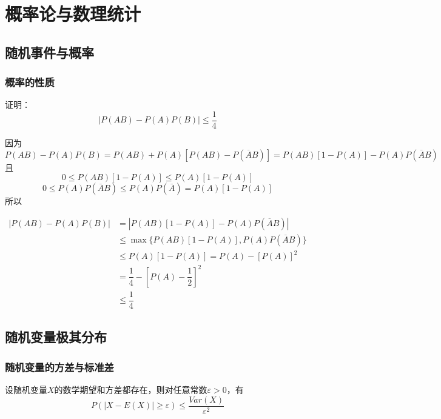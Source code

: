 \chapter{概率论与数理统计}

\section{随机事件与概率}

\subsection{概率的性质}

\begin{proposition}

    证明：
    $$|P(AB) - P(A)P(B)| \leq \dfrac{1}{4}$$

\end{proposition}

\begin{proposition}

    因为
    $$P(AB) - P(A)P(B) = P(AB) + P(A)[P(AB) - P(\overline{A}B)] = P(AB)[1 - P(A)] - P(A)P(\overline{A}B)$$
    且
    $$0 \leq P(AB)[1 - P(A)] \leq P(A)[1 - P(A)]$$
    $$0 \leq P(A)P(\overline{A}B) \leq P(A)P(\overline{A}) = P(A)[1 - P(A)]$$
    所以
    
    \begin{align*}
        |P(AB) - P(A)P(B)| & = |P(AB)[1 - P(A)] - P(A)P(\overline{A}B)| \\
        & \leq \max\{P(AB)[1 - P(A)], P(A)P(\overline{A}B)\} \\
        & \leq P(A)[1 - P(A)] = P(A) - [P(A)]^2 \\
        & = \dfrac{1}{4} - \left[ P(A) - \dfrac{1}{2} \right]^2 \\
        & \leq \dfrac{1}{4}
    \end{align*}

\end{proposition}

\section{随机变量极其分布}

\subsection{随机变量的方差与标准差}

\begin{theorem}[Chebyshev不等式]
    
    设随机变量$X$的数学期望和方差都存在，则对任意常数$\varepsilon > 0$，有
    $$P(|X - E(X)| \geq \varepsilon) \leq \dfrac{Var(X)}{\varepsilon^2}$$

\end{theorem}

